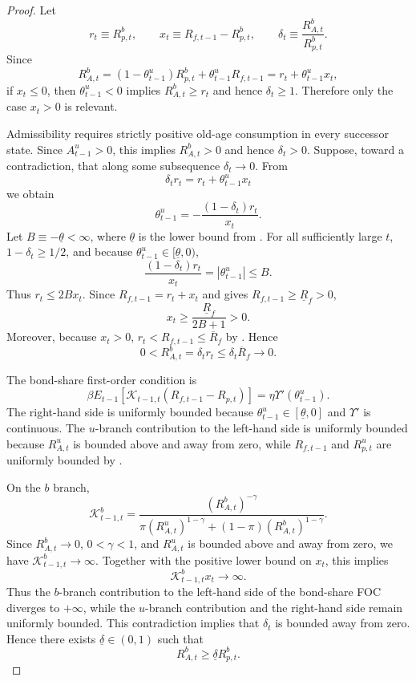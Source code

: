 \documentclass{article}
\begin{document}
\begin{proof}
Let
\[
r_t\equiv R_{p,t}^b,
\qquad
x_t\equiv R_{f,t-1}-R_{p,t}^b,
\qquad
\delta_t\equiv \frac{R_{A,t}^b}{R_{p,t}^b}.
\]
Since
\[
R_{A,t}^b=(1-\theta_{t-1}^u)R_{p,t}^b+\theta_{t-1}^uR_{f,t-1}
=r_t+\theta_{t-1}^u x_t,
\]
if $x_t\le0$, then $\theta_{t-1}^u<0$ implies $R_{A,t}^b\ge r_t$ and hence $\delta_t\ge1$. Therefore only the case $x_t>0$ is relevant.

Admissibility requires strictly positive old-age consumption in every successor state. Since $A_{t-1}^u>0$, this implies $R_{A,t}^b>0$ and hence $\delta_t>0$. Suppose, toward a contradiction, that along some subsequence $\delta_t\to0$. From
\[
\delta_t r_t=r_t+\theta_{t-1}^u x_t
\]
we obtain
\[
\theta_{t-1}^u=-\frac{(1-\delta_t)r_t}{x_t}.
\]
Let $B\equiv-\underline\theta<\infty$, where $\underline\theta$ is the lower bound from . For all sufficiently large $t$, $1-\delta_t\ge1/2$, and because $\theta_{t-1}^u\in[\underline\theta,0)$,
\[
\frac{(1-\delta_t)r_t}{x_t}=|\theta_{t-1}^u|\le B.
\]
Thus $r_t\le 2B x_t$. Since $R_{f,t-1}=r_t+x_t$ and  gives $R_{f,t-1}\ge\underline R_f>0$,
\[
x_t\ge \frac{\underline R_f}{2B+1}>0.
\]
Moreover, because $x_t>0$, $r_t<R_{f,t-1}\le\overline R_f$ by . Hence
\[
0<R_{A,t}^b=\delta_t r_t\le\delta_t\overline R_f\to0.
\]

The bond-share first-order condition is
\[
\beta E_{t-1}\!\left[\mathcal K_{t-1,t}(R_{f,t-1}-R_{p,t})\right]
=
\eta\Upsilon'(\theta_{t-1}^u).
\]
The right-hand side is uniformly bounded because $\theta_{t-1}^u\in[\underline\theta,0]$ and $\Upsilon'$ is continuous. The $u$-branch contribution to the left-hand side is uniformly bounded because $R_{A,t}^u$ is bounded above and away from zero, while $R_{f,t-1}$ and $R_{p,t}^u$ are uniformly bounded by .

On the $b$ branch,
\[
\mathcal K_{t-1,t}^b
=
\frac{(R_{A,t}^b)^{-\gamma}}
{\pi (R_{A,t}^u)^{1-\gamma}+(1-\pi)(R_{A,t}^b)^{1-\gamma}}.
\]
Since $R_{A,t}^b\to0$, $0<\gamma<1$, and $R_{A,t}^u$ is bounded above and away from zero, we have $\mathcal K_{t-1,t}^b\to\infty$. Together with the positive lower bound on $x_t$, this implies
\[
\mathcal K_{t-1,t}^b x_t\to\infty.
\]
Thus the $b$-branch contribution to the left-hand side of the bond-share FOC diverges to $+\infty$, while the $u$-branch contribution and the right-hand side remain uniformly bounded. This contradiction implies that $\delta_t$ is bounded away from zero. Hence there exists $\underline\delta\in(0,1)$ such that
\[
R_{A,t}^b\ge\underline\delta R_{p,t}^b.
\]
\end{proof}
\end{document}
